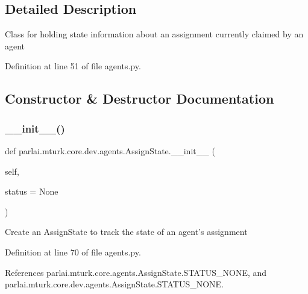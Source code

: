 \subsection{Detailed Description}
\begin{DoxyVerb}Class for holding state information about an assignment currently
claimed by an agent
\end{DoxyVerb}
 

Definition at line 51 of file agents.\+py.



\subsection{Constructor \& Destructor Documentation}
\mbox{\label{classparlai_1_1mturk_1_1core_1_1dev_1_1agents_1_1AssignState_a9976e9b61eb5425255601bc99a10fdc7}} 
\subsubsection{\texorpdfstring{\+\_\+\+\_\+init\+\_\+\+\_\+()}{\_\_init\_\_()}}
{\footnotesize\ttfamily def parlai.\+mturk.\+core.\+dev.\+agents.\+Assign\+State.\+\_\+\+\_\+init\+\_\+\+\_\+ (\begin{DoxyParamCaption}\item[{}]{self,  }\item[{}]{status = {\ttfamily None} }\end{DoxyParamCaption})}

\begin{DoxyVerb}Create an AssignState to track the state of an agent's assignment\end{DoxyVerb}
 

Definition at line 70 of file agents.\+py.



References parlai.\+mturk.\+core.\+agents.\+Assign\+State.\+S\+T\+A\+T\+U\+S\+\_\+\+N\+O\+NE, and parlai.\+mturk.\+core.\+dev.\+agents.\+Assign\+State.\+S\+T\+A\+T\+U\+S\+\_\+\+N\+O\+NE.




